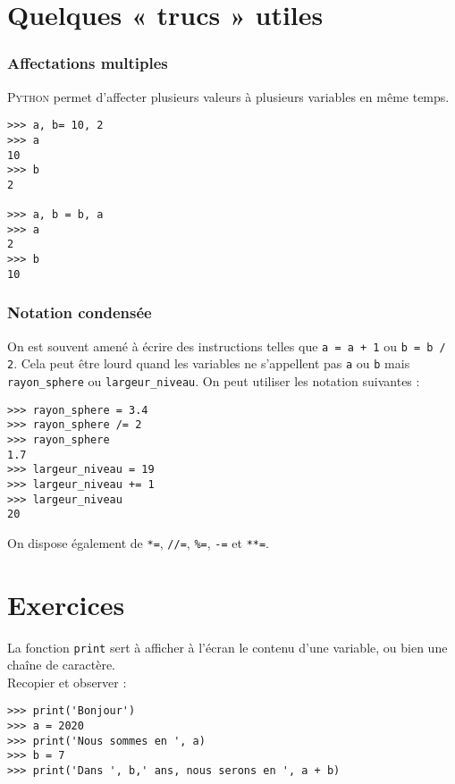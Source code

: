 \section{Quelques « trucs »  utiles}

\subsubsection*{Affectations multiples}
\textsc{Python} permet d'affecter plusieurs valeurs à plusieurs variables en même temps.

\begin{pys}\begin{verbatim}
>>> a, b= 10, 2
>>> a
10
>>> b
2

>>> a, b = b, a
>>> a
2
>>> b
10
\end{verbatim}
\end{pys}

\subsubsection*{Notation condensée}
On est souvent amené à écrire des instructions telles que  \texttt{a = a + 1} ou \texttt{b = b / 2}. Cela peut être lourd quand les variables ne s'appellent
pas \texttt{a} ou \texttt{b} mais \texttt{rayon_sphere} ou \texttt{largeur_niveau}. On peut utiliser les notation suivantes :
\begin{pys}\begin{verbatim}
>>> rayon_sphere = 3.4
>>> rayon_sphere /= 2
>>> rayon_sphere
1.7
>>> largeur_niveau = 19
>>> largeur_niveau += 1
>>> largeur_niveau
20
\end{verbatim}
\end{pys}

On dispose également de \texttt{*=}, \texttt{//=}, \texttt{\%=}, \texttt{-=} et \texttt{**=}.
\section{Exercices}

\begin{exercice}

    La fonction \texttt{print} sert à afficher à l'écran le contenu d'une variable, ou bien une chaîne de caractère.\\
    Recopier et observer :
\begin{verbatim}
>>> print('Bonjour')
>>> a = 2020
>>> print('Nous sommes en ', a)
>>> b = 7
>>> print('Dans ', b,' ans, nous serons en ', a + b)
\end{verbatim}
\end{exercice}

